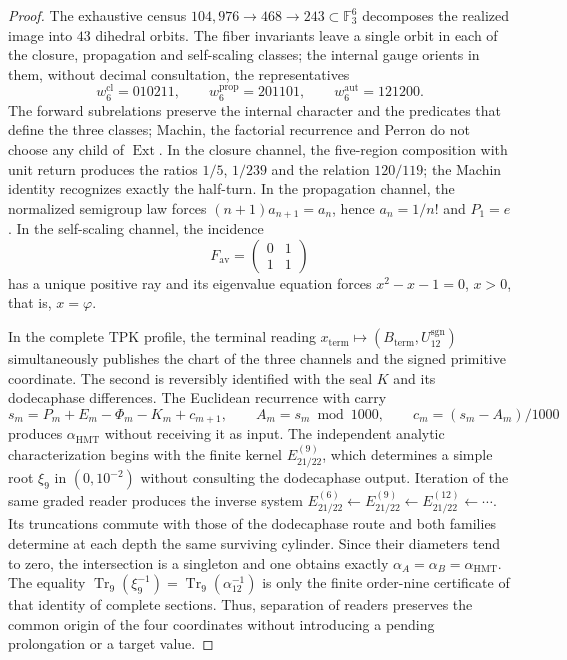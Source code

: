 \begin{proof}
The exhaustive census
\(104,976\to468\to243\subset\mathbb F_3^6\) decomposes the realized image
into \(43\) dihedral orbits. The fiber invariants leave a single orbit
in each of the closure, propagation and self-scaling classes; the internal
gauge orients in them, without decimal consultation, the representatives
\[
 w_6^{\mathrm{cl}}=010211,
 \qquad w_6^{\mathrm{prop}}=201101,
 \qquad w_6^{\mathrm{aut}}=121200.
\]
The forward subrelations preserve the internal character and the predicates that
define the three classes; Machin, the factorial recurrence and Perron do not choose
any child of \(\operatorname{Ext}\). In the
closure channel, the five-region composition with unit return produces
the ratios \(1/5\), \(1/239\) and the relation \(120/119\); the Machin identity
recognizes exactly the half-turn. In the propagation channel, the
normalized semigroup law forces
\((n+1)a_{n+1}=a_n\), hence \(a_n=1/n!\) and \(P_1=e\). In the self-scaling
channel, the incidence
\[
 F_{\mathrm{av}}=\begin{pmatrix}0&1\\1&1\end{pmatrix}
\]
has a unique positive ray and its eigenvalue equation forces
\(x^2-x-1=0\), \(x>0\), that is, \(x=\varphi\).

In the complete TPK profile, the terminal reading
\(x_{\mathrm{term}}\mapsto(B_{\mathrm{term}},U_{12}^{\mathrm{sgn}})\)
simultaneously publishes the chart of the three channels and the signed primitive
coordinate. The
second is reversibly identified with the seal \(K\) and its dodecaphase
differences. The Euclidean recurrence with carry
\[
 s_m=P_m+E_m-\Phi_m-K_m+c_{m+1},\qquad
 A_m=s_m\bmod1000,\qquad
 c_m=(s_m-A_m)/1000
\]
produces \(\alpha_{\mathrm{HMT}}\) without receiving it as input. The
independent analytic characterization begins with the finite kernel
\(E_{21/22}^{(9)}\), which determines a simple root \(\xi_9\) in
\((0,10^{-2})\) without consulting the dodecaphase output. Iteration of the same
graded reader produces the inverse system
\(E_{21/22}^{(6)}\leftarrow E_{21/22}^{(9)}\leftarrow
E_{21/22}^{(12)}\leftarrow\cdots\). Its truncations commute with those of the
dodecaphase route and both families determine at each depth the same
surviving cylinder. Since their diameters tend to zero, the intersection is
a singleton and one obtains exactly
\(\alpha_A=\alpha_B=\alpha_{\mathrm{HMT}}\). The equality
\(\operatorname{Tr}_9(\xi_9^{-1})=
\operatorname{Tr}_9(\alpha_{12}^{-1})\) is only the finite order-nine
certificate of that identity of complete sections. Thus, separation
of readers preserves the common origin of the four coordinates without introducing
a pending prolongation or a target value.
\end{proof}

